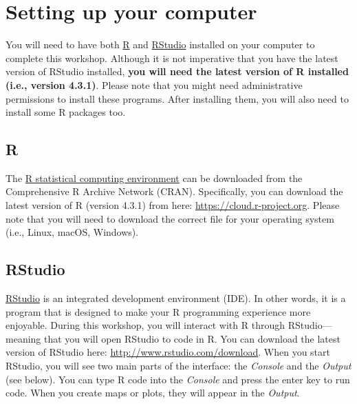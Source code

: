 \documentclass[
  12pt,
]{book}
\begin{document}
\hypertarget{setup}{%
\section{Setting up your computer}\label{setup}}

You will need to have both \href{https://www.r-project.org}{R} and \href{https://www.rstudio.com/}{RStudio} installed on your computer to complete this workshop. Although it is not imperative that you have the latest version of RStudio installed, \textbf{you will need the latest version of R installed (i.e., version 4.3.1)}. Please note that you might need administrative permissions to install these programs. After installing them, you will also need to install some R packages too.

\clearpage

\hypertarget{r}{%
\subsection{R}\label{r}}

The \href{https://www.r-project.org}{R statistical computing environment} can be downloaded from the Comprehensive R Archive Network (CRAN). Specifically, you can download the latest version of R (version 4.3.1) from here: \url{https://cloud.r-project.org}. Please note that you will need to download the correct file for your operating system (i.e., Linux, macOS, Windows).

\hypertarget{rstudio}{%
\subsection{RStudio}\label{rstudio}}

\href{https://www.rstudio.com}{RStudio} is an integrated development environment (IDE). In other words, it is a program that is designed to make your R programming experience more enjoyable. During this workshop, you will interact with R through RStudio---meaning that you will open RStudio to code in R. You can download the latest version of RStudio here: \url{http://www.rstudio.com/download}. When you start RStudio, you will see two main parts of the interface: the \emph{Console} and the \emph{Output} (see below). You can type R code into the \emph{Console} and press the enter key to run code. When you create maps or plots, they will appear in the \emph{Output}.
\end{document}

